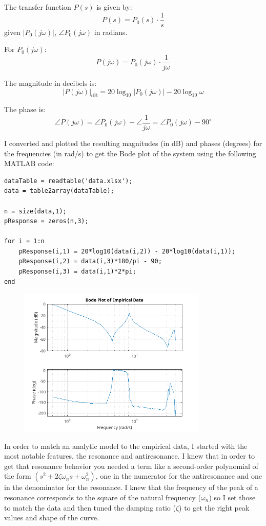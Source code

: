 \documentclass{article}
\begin{document}
The transfer function \(P(s)\) is given by:
\[
P(s) = P_0(s) \cdot \frac{1}{s}
\]
given \(|P_0(j\omega)|\), \(\angle P_0(j\omega)\) in radians.

For \(P_0(j\omega)\):
\[
P(j\omega) = P_0(j\omega) \cdot \frac{1}{j\omega}
\]

The magnitude in decibels is:
\[
|P(j\omega)|_{\text{dB}} = 20 \log_{10} |P_0(j\omega)| - 20 \log_{10} \omega
\]

The phase is:
\[
\angle P(j\omega) = \angle P_0(j\omega) - \angle \frac{1}{j\omega} = \angle P_0(j\omega) - 90^\circ
\]

I converted and plotted the resulting magnitudes (in dB) and phases (degrees) for the frequencies (in rad/s) to get the Bode plot of the system using the following MATLAB code:

\begin{lstlisting}[style=matlabstyle]
dataTable = readtable('data.xlsx');
data = table2array(dataTable);

n = size(data,1);
pResponse = zeros(n,3);

for i = 1:n
    pResponse(i,1) = 20*log10(data(i,2)) - 20*log10(data(i,1));
    pResponse(i,2) = data(i,3)*180/pi - 90;
    pResponse(i,3) = data(i,1)*2*pi;
end
\end{lstlisting}

\begin{figure}[H]
    \centering
    \includegraphics[width=0.8\textwidth]{empiricalBodePlot.png}
    \label{fig:empiricalBodePlot}
\end{figure}

In order to match an analytic model to the empirical data, I started with the most notable features, the resonance and antiresonance.
I knew that in order to get that resonance behavior you needed a term like a second-order polynomial of the form \((s^2 + 2\zeta\omega_n s + \omega_n^2)\), one in the numerator for the antiresonance and one in the denominator for the resonance.
I knew that the frequency of the peak of a resonance corresponds to the square of the natural frequency ($\omega_n$) so I set those to match the data and then tuned the damping ratio (\(\zeta\)) to get the right peak values and shape of the curve.
\end{document}
